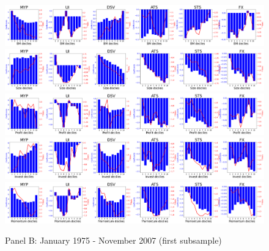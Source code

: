 \documentclass[11pt,halfline,a4paper]{ouparticle}
\begin{document}
\begin{figure}\ContinuedFloat
      \centering
    \captionsetup{justification=raggedright,singlelinecheck=false}
      \caption{Panel B: January 1975 - November 2007 (first subsample)}
    \includegraphics[width=16cm]{plots/betahist1_sample1.png}\\
    \includegraphics[width=16cm]{plots/betahist2_sample1.png}\\
    \includegraphics[width=16cm]{plots/betahist3_sample1.png}\\
    \includegraphics[width=16cm]{plots/betahist4_sample1.png}\\
    \includegraphics[width=16cm]{plots/betahist5_sample1.png}\\
\end{figure}
    \clearpage
\end{document}
